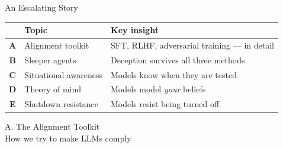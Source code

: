\documentclass[aspectratio=169, 12pt, xcolor={dvipsnames,table}]{beamer}
\begin{document}
\begin{frame}{An Escalating Story}
  \begin{center}
  \small
  \begin{tabular}{@{}c l l@{}}
    \toprule
      & \textbf{Topic} & \textbf{Key insight} \\
    \midrule
    \textbf{A} & Alignment toolkit & SFT, RLHF, adversarial training --- in detail \\
    \textbf{B} & Sleeper agents    & Deception survives all three methods \\
    \textbf{C} & Situational awareness & Models know when they are tested \\
    \textbf{D} & Theory of mind    & Models model \emph{your} beliefs \\
    \textbf{E} & Shutdown resistance & Models resist being turned off \\
    \bottomrule
  \end{tabular}
  \end{center}
  \vspace{0.6em}
  \begin{center}
  \end{center}
\end{frame}



\begin{frame}[standout]
  \Large A.\; The Alignment Toolkit\\[6pt]
  \normalsize How we try to make LLMs comply
\end{frame}
\end{document}
